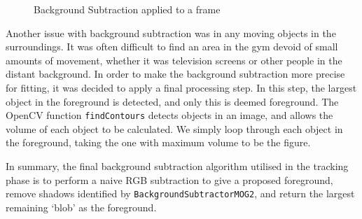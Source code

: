 \begin{figure}[H]
    \centering
\caption{Background Subtraction applied to a frame}
\label{fig:bgsub}
\end{figure}

Another issue with background subtraction was in any moving objects in the surroundings. It was often difficult to find an area in the gym devoid of small amounts of movement, whether it was television screens or other people in the distant background. In order to make the background subtraction more precise for fitting, it was decided to apply a final processing step. In this step, the largest object in the foreground is detected, and only this is deemed foreground. The OpenCV function \texttt{findContours} detects objects in an image, and allows the volume of each object to be calculated. We simply loop through each object in the foreground, taking the one with maximum volume to be the figure.

In summary, the final background subtraction algorithm utilised in the tracking phase is to perform a naive RGB subtraction to give a proposed foreground, remove shadows identified by \texttt{BackgroundSubtractorMOG2}, and return the largest remaining `blob' as the foreground.
